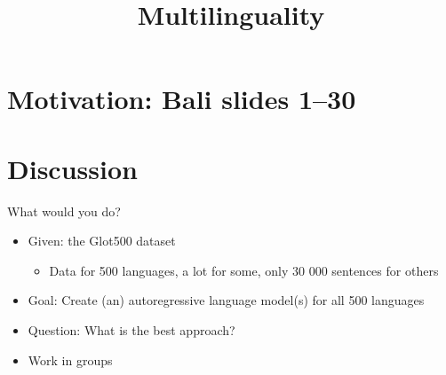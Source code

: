 



\newcommand{\titlefigure}{figure/babel.png}
\newcommand{\learninggoals}{
\item Understand why we need multilingual models
\item Understand the challenges
\item Brainstorm solutions
}

\title{Multilinguality}
\date{}


\lecturechapter{}













\section{Motivation: Bali slides 1--30}

\section{Discussion}

\begin{vbframe}{What would you do?}

\vfill

	\begin{itemize}
\item Given: the Glot500 dataset
	\begin{itemize}
        \item Data for 500 languages, a lot for some, only
        30 000 sentences for others
\end{itemize}
\item Goal: Create (an) autoregressive language model(s) for
        all 500 languages
\item Question: What is the best approach?
\item Work in groups
\end{itemize}

\vfill

\end{vbframe}


